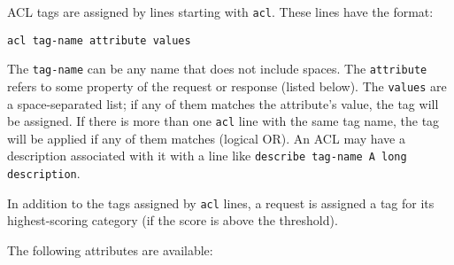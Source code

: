 \documentclass{article}
\begin{document}
ACL tags are assigned by lines starting with \verb"acl". 
These lines have the format:

\begin{verbatim}
acl tag-name attribute values
\end{verbatim}

The \verb"tag-name" can be any name that does not include spaces.
The \verb"attribute" refers to some property of the request or response (listed below).
The \verb"values" are a space-separated list; if any of them matches the attribute's value, the tag will be assigned.
If there is more than one \verb"acl" line with the same tag name, the tag will be applied if any of them matches (logical OR).
An ACL may have a description associated with it with a line like \verb"describe tag-name A long description".

In addition to the tags assigned by \verb"acl" lines, a request is assigned a tag for its highest-scoring category
(if the score is above the threshold).

The following attributes are available:
\end{document}
